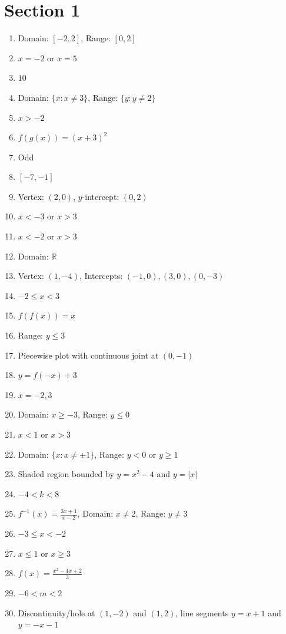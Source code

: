 \documentclass{article}
\begin{document}
\section*{Section 1}
\begin{enumerate}
    \item Domain: $[-2, 2]$, Range: $[0, 2]$
    \item $x = -2$ or $x = 5$
    \item $10$
    \item Domain: $\{x: x \neq 3\}$, Range: $\{y: y \neq 2\}$
    \item $x > -2$
    \item $f(g(x)) = (x+3)^2$
    \item Odd
    \item $[-7, -1]$
    \item Vertex: $(2,0)$, $y$-intercept: $(0,2)$
    \item $x < -3$ or $x > 3$
    \item $x < -2$ or $x > 3$
    \item Domain: $\mathbb{R}$
    \item Vertex: $(1,-4)$, Intercepts: $(-1,0), (3,0), (0,-3)$
    \item $-2 \le x < 3$
    \item $f(f(x)) = x$
    \item Range: $y \le 3$
    \item Piecewise plot with continuous joint at $(0,-1)$
    \item $y = f(-x) + 3$
    \item $x = -2, 3$
    \item Domain: $x \ge -3$, Range: $y \le 0$
    \item $x < 1$ or $x > 3$
    \item Domain: $\{x: x \neq \pm 1\}$, Range: $y < 0$ or $y \ge 1$
    \item Shaded region bounded by $y = x^2-4$ and $y = |x|$
    \item $-4 < k < 8$
    \item $f^{-1}(x) = \frac{3x+1}{x-2}$, Domain: $x \neq 2$, Range: $y \neq 3$
    \item $-3 \le x < -2$
    \item $x \le 1$ or $x \ge 3$
    \item $f(x) = \frac{x^2 - 4x + 2}{3}$
    \item $-6 < m < 2$
    \item Discontinuity/hole at $(1,-2)$ and $(1,2)$, line segments $y=x+1$ and $y=-x-1$
\end{enumerate}
\end{document}
